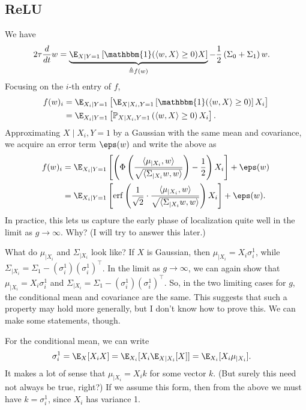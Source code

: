\documentclass[usletter,twoside,12pt]{book}
\begin{document}
\subsection{ReLU}
We have
\begin{align}
   2 \tau \frac{d}{dt} w &= \underbrace{\E_{X \mid Y=1} \left[ \mathbbm{1}(\langle w, X \rangle \geq 0) X \right]}_{\triangleq f(w)} - \frac{1}{2} \left( \Sigma_0 + \Sigma_1 \right) w.
\end{align}
Focusing on the $i$-th entry of $f$,
\begin{align}
   f(w)_i &= \E_{X_i \mid Y=1} \left[ \E_{X \mid X_i, Y=1} \left[ \mathbbm{1}(\langle w, X \rangle \geq 0) \right] X_i \right] \\
   &= \E_{X_i \mid Y=1} \left[ \mathbb{P}_{X \mid X_i, Y=1} \left( \langle w, X \rangle \geq 0 \right) X_i \right].
\end{align}
Approximating $X \mid X_i, Y=1$ by a Gaussian with the same mean and covariance, we acquire an error term $\eps(w)$ and write the above as
\begin{align}
   f(w)_i &= \E_{X_i \mid Y=1} \left[ \left( \Phi \left( \frac{ \langle \mu_{\mid X_i}, w \rangle }{ \sqrt{ \langle \Sigma_{\mid X_i} w, w \rangle } } \right) - \frac{1}{2} \right) X_i \right] + \eps(w) \\
   &= \E_{X_i \mid Y=1} \left[ \operatorname{erf} \left( \frac{1}{\sqrt{2}} \cdot \frac{ \langle \mu_{\mid X_i}, w \rangle }{ \sqrt{ \langle \Sigma_{\mid X_i} w, w \rangle } } \right) X_i \right] + \eps(w).
\end{align}
In practice, this lets us capture the early phase of localization quite well in the limit as $g \to \infty$.
Why?
(I will try to answer this later.)

What do $\mu_{\mid X_i}$ and $\Sigma_{\mid X_i}$ look like?
If $X$ is Gaussian, then $\mu_{\mid X_i} = X_i \sigma_i^1$, while $\Sigma_{\mid X_i} = \Sigma_1 - (\sigma_i^1) (\sigma_i^1)^\top$.
In the limit as $g \to \infty$, we can again show that $\mu_{\mid X_i} = X_i \sigma_i^1$ and $\Sigma_{\mid X_i} = \Sigma_1 - (\sigma_i^1) (\sigma_i^1)^\top$.
So, in the two limiting cases for $g$, the conditional mean and covariance are the same.
This suggests that such a property may hold more generally, but I don't know how to prove this.
We can make some statements, though.

For the conditional mean, we can write
\begin{align}
   \sigma_i^1 &= \E_{X}[ X_i X ] 
   = \E_{X_i}[ X_i \E_{X \mid X_i}[ X ] ]
   = \E_{X_i}[ X_i \mu_{\mid X_i} ].
\end{align}
It makes a lot of sense that $\mu_{\mid X_i} = X_i k$ for some vector $k$.
(But surely this need not always be true, right?)
If we assume this form, then from the above we must have $k = \sigma_i^1$, since $X_i$ has variance 1.
\end{document}
